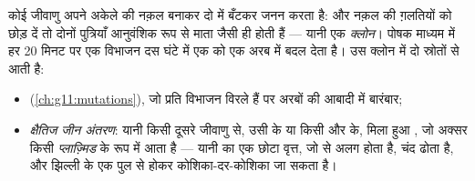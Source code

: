 \begin{proposition}[जीवाणुओं का जनन और विविधता]\label{prop:g11:antibiotic-resistance:variation}
कोई जीवाणु अपने अकेले  की नक़ल बनाकर दो में बँटकर जनन करता है:
और नक़ल की ग़लतियों को छोड़ दें तो दोनों पुत्रियाँ आनुवंशिक रूप से माता
जैसी ही होती हैं --- यानी एक \emph{क्लोन}। पोषक माध्यम में हर 20 मिनट पर
एक विभाजन दस घंटे में एक  को एक अरब में बदल देता है। उस क्लोन में
 दो स्रोतों से आती है:
\begin{itemize}
  \item \emph{} (\cref{ch:g11:mutations}), जो प्रति विभाजन
        विरले हैं पर अरबों की आबादी में बारंबार;
  \item \emph{क्षैतिज जीन अंतरण}: यानी किसी दूसरे
        जीवाणु से, उसी  के या किसी और के, मिला हुआ , जो अक्सर किसी
        \emph{प्लाज़्मिड} के रूप में आता है --- यानी  का एक छोटा वृत्त,
        जो  से अलग होता है, चंद  ढोता है, और झिल्ली के एक पुल
        से होकर कोशिका-दर-कोशिका जा सकता है।
\end{itemize}
\end{proposition}
\admitted

